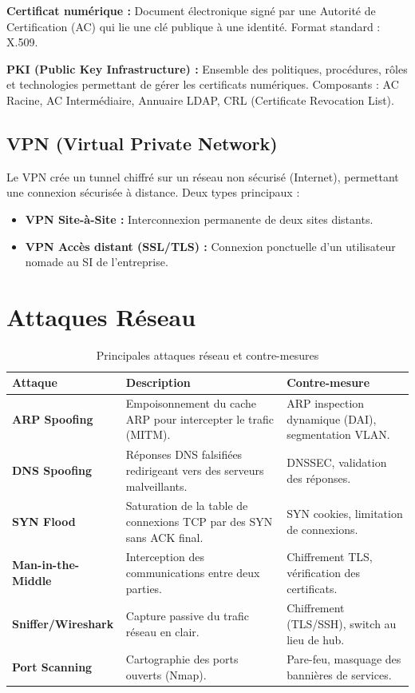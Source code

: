 \begin{boxdef}
\textbf{Certificat numérique :} Document électronique signé par une Autorité de Certification (AC) qui lie une clé publique à une identité. Format standard : X.509.

\textbf{PKI (Public Key Infrastructure) :} Ensemble des politiques, procédures, rôles et technologies permettant de gérer les certificats numériques. Composants : AC Racine, AC Intermédiaire, Annuaire LDAP, CRL (Certificate Revocation List).
\end{boxdef}

\subsection{VPN (Virtual Private Network)}
Le VPN crée un tunnel chiffré sur un réseau non sécurisé (Internet), permettant une connexion sécurisée à distance. Deux types principaux :
\begin{itemize}
    \item \textbf{VPN Site-à-Site :} Interconnexion permanente de deux sites distants.
    \item \textbf{VPN Accès distant (SSL/TLS) :} Connexion ponctuelle d'un utilisateur nomade au SI de l'entreprise.
\end{itemize}

\section{Attaques Réseau}

\begin{table}[H]
\centering
\small
\begin{tabular}{p{3cm}p{5cm}p{4cm}}
    \toprule
    \textbf{Attaque} & \textbf{Description} & \textbf{Contre-mesure} \\
    \midrule
    \textbf{ARP Spoofing} & Empoisonnement du cache ARP pour intercepter le trafic (MITM). & ARP inspection dynamique (DAI), segmentation VLAN. \\
    \textbf{DNS Spoofing} & Réponses DNS falsifiées redirigeant vers des serveurs malveillants. & DNSSEC, validation des réponses. \\
    \textbf{SYN Flood} & Saturation de la table de connexions TCP par des SYN sans ACK final. & SYN cookies, limitation de connexions. \\
    \textbf{Man-in-the-Middle} & Interception des communications entre deux parties. & Chiffrement TLS, vérification des certificats. \\
    \textbf{Sniffer/Wireshark} & Capture passive du trafic réseau en clair. & Chiffrement (TLS/SSH), switch au lieu de hub. \\
    \textbf{Port Scanning} & Cartographie des ports ouverts (Nmap). & Pare-feu, masquage des bannières de services. \\
    \bottomrule
\end{tabular}
\caption{Principales attaques réseau et contre-mesures}
\end{table}

